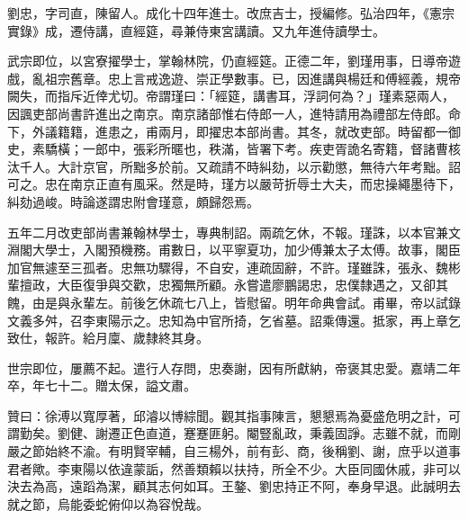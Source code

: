 \begin{pinyinscope}
劉忠，字司直，陳留人。成化十四年進士。改庶吉士，授編修。弘治四年，《憲宗實錄》成，遷侍講，直經筵，尋兼侍東宮講讀。又九年進侍讀學士。

武宗即位，以宮寮擢學士，掌翰林院，仍直經筵。正德二年，劉瑾用事，日導帝遊戲，亂祖宗舊章。忠上言戒逸遊、崇正學數事。已，因進講與楊廷和傅經義，規帝闕失，而指斥近倖尤切。帝謂瑾曰：「經筵，講書耳，浮詞何為？」瑾素惡兩人，因諷吏部尚書許進出之南京。南京諸部惟右侍郎一人，進特請用為禮部左侍郎。命下，外議籍籍，進患之，甫兩月，即擢忠本部尚書。其冬，就改吏部。時留都一御史，素驕橫；一郎中，張彩所暱也，秩滿，皆署下考。疾吏胥詭名寄籍，督諸曹核汰千人。大計京官，所黜多於前。又疏請不時糾劾，以示勸懲，無待六年考黜。詔可之。忠在南京正直有風采。然是時，瑾方以嚴苛折辱士大夫，而忠操繩墨待下，糾劾過峻。時論遂謂忠附會瑾意，頗歸怨焉。

五年二月改吏部尚書兼翰林學士，專典制詔。兩疏乞休，不報。瑾誅，以本官兼文淵閣大學士，入閣預機務。甫數日，以平寧夏功，加少傅兼太子太傅。故事，閣臣加官無遽至三孤者。忠無功驟得，不自安，連疏固辭，不許。瑾雖誅，張永、魏彬輩擅政，大臣復爭與交歡，忠獨無所顧。永嘗遣廖鵬謁忠，忠僕隸遇之，又卻其餽，由是與永輩左。前後乞休疏七八上，皆慰留。明年命典會試。甫畢，帝以試錄文義多舛，召李東陽示之。忠知為中官所掎，乞省墓。詔乘傳還。抵家，再上章乞致仕，報許。給月廩、歲隸終其身。

世宗即位，屢薦不起。遣行人存問，忠奏謝，因有所獻納，帝褒其忠愛。嘉靖二年卒，年七十二。贈太保，謚文肅。

贊曰：徐溥以寬厚著，邱濬以博綜聞。觀其指事陳言，懇懇焉為憂盛危明之計，可謂勤矣。劉健、謝遷正色直道，蹇蹇匪躬。閹豎亂政，秉義固諍。志雖不就，而剛嚴之節始終不渝。有明賢宰輔，自三楊外，前有彭、商，後稱劉、謝，庶乎以道事君者歟。李東陽以依違蒙詬，然善類賴以扶持，所全不少。大臣同國休戚，非可以決去為高，遠蹈為潔，顧其志何如耳。王鏊、劉忠持正不阿，奉身早退。此誠明去就之節，烏能委蛇俯仰以為容悅哉。


\end{pinyinscope}